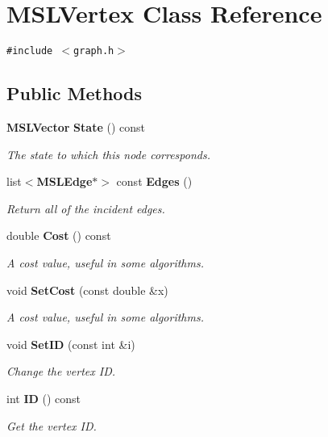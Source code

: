 \section{MSLVertex  Class Reference}
\label{class_MSLVertex}
{\tt \#include $<$graph.h$>$}

\subsection*{Public Methods}
\begin{CompactItemize}
\item 
{\bf MSLVector} {\bf State} () const
\begin{CompactList}\small\item\em The state to which this node corresponds.\item\end{CompactList}\item 
list$<${\bf MSLEdge}$\ast$$>$ const {\bf Edges} ()
\begin{CompactList}\small\item\em Return all of the incident edges.\item\end{CompactList}\item 
double {\bf Cost} () const
\begin{CompactList}\small\item\em A cost value, useful in some algorithms.\item\end{CompactList}\item 
void {\bf Set\-Cost} (const double \&x)
\begin{CompactList}\small\item\em A cost value, useful in some algorithms.\item\end{CompactList}\item 
void {\bf Set\-ID} (const int \&i)
\begin{CompactList}\small\item\em Change the vertex ID.\item\end{CompactList}\item 
int {\bf ID} () const
\begin{CompactList}\small\item\em Get the vertex ID.\item\end{CompactList}\item 
$$
\end{CompactItemize}
